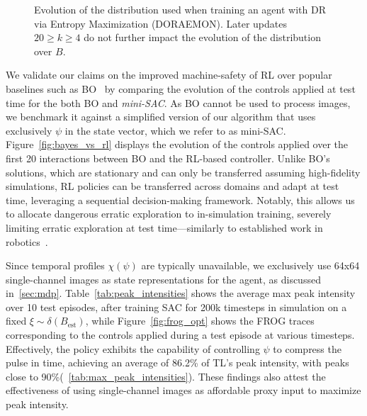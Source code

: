 \begin{figure}
\begin{minipage}{0.48\linewidth}
        \caption{Evolution of the distribution used when training an agent with DR via Entropy Maximization (DORAEMON). Later updates $20 \geq k \geq 4$ do not further impact the evolution of the distribution over $B$.
        }
        \label{fig:DORAEMON_distrs_over_training}
    \end{minipage}
\end{figure}

We validate our claims on the improved machine-safety of RL over popular baselines such as BO~\citep{shalloo2020automation} by comparing the evolution of the controls applied at test time for the both BO and \emph{mini-SAC}. As BO cannot be used to process images, we benchmark it against a simplified version of our algorithm that uses exclusively $\psi$ in the state vector, which we refer to as mini-SAC. Figure~\ref{fig:bayes_vs_rl} displays the evolution of the controls applied over the first 20 interactions between BO and the RL-based controller. Unlike BO's solutions, which are stationary and can only be transferred assuming high-fidelity simulations, RL policies can be transferred across domains and adapt at test time, leveraging a sequential decision-making framework.
Notably, this allows us to allocate dangerous erratic exploration to in-simulation training, severely limiting erratic exploration at test time---similarly to established work in robotics~\citep{kober2013reinforcement}. 

Since temporal profiles $\chi(\psi)$ are typically unavailable, we exclusively use 64x64 single-channel images as state representations for the agent, as discussed in~\ref{sec:mdp}. 
Table~\ref{tab:peak_intensities} shows the average max peak intensity over 10 test episodes, after training SAC for 200k timesteps in simulation on a fixed \( \xi \sim \delta(B_{\text{est}}) \), while Figure~\ref{fig:frog_opt} shows the FROG traces corresponding to the controls applied during a test episode at various timesteps. Effectively, the policy exhibits the capability of controlling $\psi$ to compress the pulse in time, achieving an average of 86.2\% of TL's peak intensity, with peaks close to 90\%(~\ref{tab:max_peak_intensities}). These findings also attest the effectiveness of using single-channel images as affordable proxy input to maximize peak intensity.

